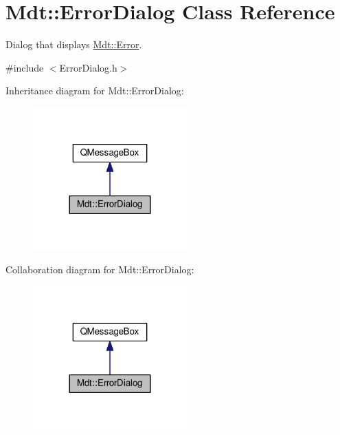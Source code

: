 \hypertarget{class_mdt_1_1_error_dialog}{}\section{Mdt\+:\+:Error\+Dialog Class Reference}
\label{class_mdt_1_1_error_dialog}


Dialog that displays \hyperlink{class_mdt_1_1_error}{Mdt\+::\+Error}.  




{\ttfamily \#include $<$Error\+Dialog.\+h$>$}



Inheritance diagram for Mdt\+:\+:Error\+Dialog\+:\nopagebreak
\begin{figure}[H]
\begin{center}
\leavevmode
\includegraphics[width=168pt]{class_mdt_1_1_error_dialog__inherit__graph}
\end{center}
\end{figure}


Collaboration diagram for Mdt\+:\+:Error\+Dialog\+:\nopagebreak
\begin{figure}[H]
\begin{center}
\leavevmode
\includegraphics[width=168pt]{class_mdt_1_1_error_dialog__coll__graph}
\end{center}
\end{figure}
